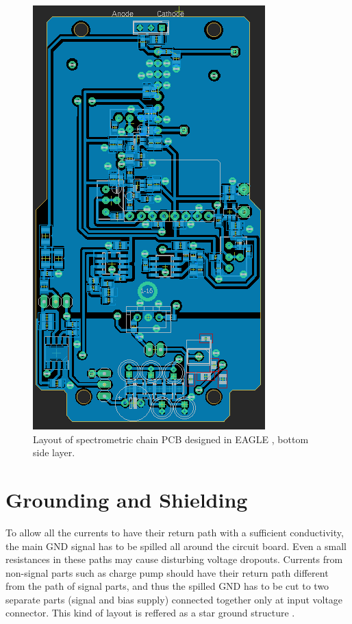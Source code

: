 \begin{figure}[H]
 \centering
 \includegraphics[scale=0.8, angle = 90]{./pictures/S14bottomLay.png}
 \caption{Layout of spectrometric chain PCB designed in EAGLE \cite{eagle}, bottom side layer.}
 \label{layout bottom}
 
\end{figure}
\newpage





\section{Grounding and Shielding}
To allow all the currents to have their return path with a sufficient conductivity, the main GND signal has to be spilled all around the circuit board. Even a small resistances in these paths may cause disturbing voltage dropouts. Currents from non-signal parts such as charge pump should have their return path different from the path of signal parts, and thus the spilled GND has to be cut to two separate parts (signal and bias supply) connected together only at input voltage connector. This kind of layout is reffered as a star ground structure \cite{star}.

